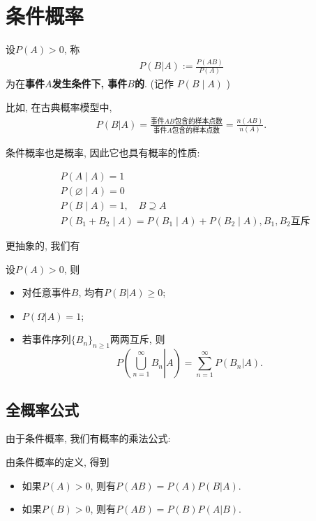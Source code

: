 \section{条件概率}

\begin{definition}
    设$P(A)>0$, 称
    \begin{align*}
        P(B|A):=\frac{P(AB)}{P(A)}
    \end{align*}
    为在\textbf{事件$A$发生条件下, 事件$B$的}. (记作 $P(B \mid A)$ )
\end{definition}

比如, 在古典概率模型中, 
\begin{align*}
    P(B|A)=\frac{\mbox{事件$AB$包含的样本点数}}{\mbox{事件$A$包含的样本点数}}=\frac{n(AB)}{n(A)}.
\end{align*}

条件概率也是概率, 因此它也具有概率的性质:

$$
\begin{aligned}
& P(A \mid A)=1 \\
& P(\varnothing \mid A)=0 \\
& P(B \mid A)=1, \quad B \supseteq A \\
& P\left(B_1+B_2 \mid A\right)=P\left(B_1 \mid A\right)+P\left(B_2 \mid A\right), B_1,B_2\text{互斥}
\end{aligned}
$$

更抽象的, 我们有

\begin{proposition}
    设$P(A)>0$, 则
    \begin{itemize}
        \item 对任意事件$B$, 均有$P(B|A)\ge 0$; 
        \item $P(\Omega|A)=1$; 
        \item 若事件序列$\{B_n\}_{n\ge 1}$两两互斥, 则
              $$P\left( \left. \bigcup_{n=1}^{\infty} B_n \right| A\right)=\sum_{n=1}^{\infty} P(B_n|A).$$
    \end{itemize}
\end{proposition}



\subsection*{全概率公式}

由于条件概率, 我们有概率的乘法公式:

\begin{theorem}[乘法公式]
    由条件概率的定义, 得到
    \begin{itemize}
        \item 如果$P(A)>0$, 则有$P(AB)=P(A)P(B|A)$. 
        \item 如果$P(B)>0$, 则有$P(AB)=P(B)P(A|B)$. 
    \end{itemize}
\end{theorem}

